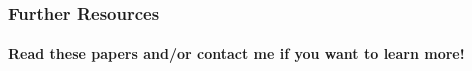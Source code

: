 
\begin{frame}
  \frametitle{Further Resources}
  \framesubtitle{Read these papers and/or contact me if you want to learn more!}

    \raggedright
    \nocite{*}
    \printbibliography

\end{frame}
